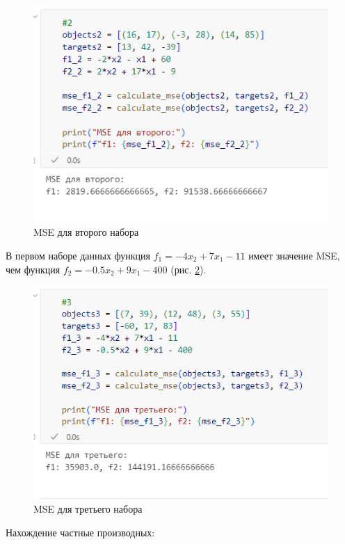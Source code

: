\documentclass[14pt,a4paper]{extarticle}
\begin{document}
\begin{figure}[h!]
    \centering
    \includegraphics[scale=0.9]{pic6/1.2.png}
    \caption{MSE для второго набора}
    \label{pic:mse2}
\end{figure}
\FloatBarrier

В первом наборе данных функция
$f_1=-4x_2+7x_1-11$ имеет значение MSE, чем функция $f_2=-0.5x_2+9x_1-400$ (рис. \ref{pic:mse3}).

\begin{figure}[h!]
    \centering
    \includegraphics[scale=0.9]{pic6/1.3.png}
    \caption{MSE для третьего набора}
    \label{pic:mse3}
\end{figure}
\FloatBarrier

Нахождение частные производных:
\end{document}
